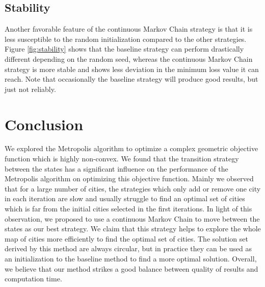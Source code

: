 \documentclass[conference,compsoc]{IEEEtran}
\begin{document}
\subsection{Stability}
Another favorable feature of the continuous Markov Chain strategy is that it is
less susceptible to the random initialization compared to the other strategies.
Figure \ref{fig:stability} shows that the baseline strategy can perform
drastically different depending on the random seed, whereas the continuous
Markov Chain strategy is more stable and shows less deviation in the minimum
loss value it can reach. Note that occasionally the baseline strategy will
produce good results, but just not reliably.

\section{Conclusion}
We explored the Metropolis algorithm to optimize a complex geometric objective
function which is highly non-convex. We found that the transition strategy
between the states has a significant influence on the performance of the
Metropolis algorithm on optimizing this objective function. Mainly we observed
that for a large number of cities, the strategies which only add or remove one
city in each iteration are slow and usually struggle to find an optimal set of
cities which is far from the initial cities selected in the first iterations. In
light of this observation, we proposed to use a continuous Markov Chain to move
between the states as our best strategy. We claim that this strategy helps to
explore the whole map of cities more efficiently to find the optimal set of
cities. The solution set derived by this method are always circular, but in
practice they can be used as an initialization to the baseline method to find a
more optimal solution. Overall, we believe that our method strikes a good
balance between quality of results and computation time.




\end{document}

